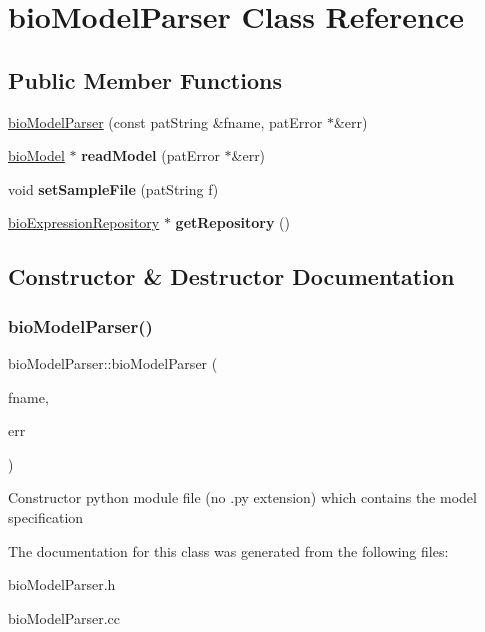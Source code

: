 \hypertarget{classbio_model_parser}{}\section{bio\+Model\+Parser Class Reference}
\label{classbio_model_parser}
\subsection*{Public Member Functions}
\begin{DoxyCompactItemize}
\item 
\hyperlink{classbio_model_parser_a145c427808e19ef543354f261ddfc878}{bio\+Model\+Parser} (const pat\+String \&fname, pat\+Error $\ast$\&err)
\item 
\mbox{\label{classbio_model_parser_ab06c134b3a1769f01d04df1507400444}} 
\hyperlink{classbio_model}{bio\+Model} $\ast$ {\bfseries read\+Model} (pat\+Error $\ast$\&err)
\item 
\mbox{\label{classbio_model_parser_a6031910f58623783fb6e60d12fdd028e}} 
void {\bfseries set\+Sample\+File} (pat\+String f)
\item 
\mbox{\label{classbio_model_parser_ae56aa4dbaf501889c68c99a3de769a9a}} 
\hyperlink{classbio_expression_repository}{bio\+Expression\+Repository} $\ast$ {\bfseries get\+Repository} ()
\end{DoxyCompactItemize}


\subsection{Constructor \& Destructor Documentation}
\mbox{\label{classbio_model_parser_a145c427808e19ef543354f261ddfc878}} 
\subsubsection{\texorpdfstring{bio\+Model\+Parser()}{bioModelParser()}}
{\footnotesize\ttfamily bio\+Model\+Parser\+::bio\+Model\+Parser (\begin{DoxyParamCaption}\item[{const pat\+String \&}]{fname,  }\item[{pat\+Error $\ast$\&}]{err }\end{DoxyParamCaption})}

Constructor  python module file (no .py extension) which contains the model specification 

The documentation for this class was generated from the following files\+:\begin{DoxyCompactItemize}
\item 
bio\+Model\+Parser.\+h\item 
bio\+Model\+Parser.\+cc\end{DoxyCompactItemize}
